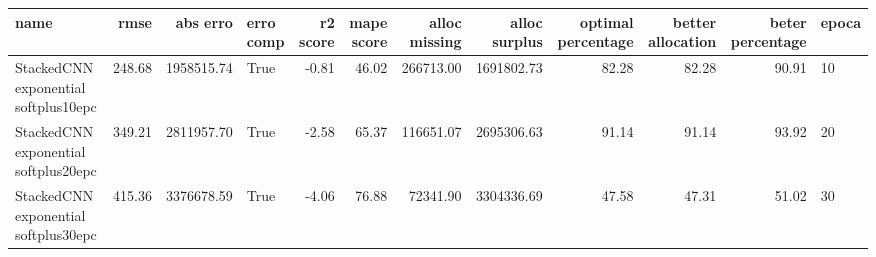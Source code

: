 \begin{tabular}{lrrlrrrrrrrl}
\toprule
name & rmse & abs erro & erro comp & r2 score & mape score & alloc missing & alloc surplus & optimal percentage & better allocation & beter percentage & epoca \\
\midrule
StackedCNN exponential softplus10epc & 248.68 & 1958515.74 & True & -0.81 & 46.02 & 266713.00 & 1691802.73 & 82.28 & 82.28 & 90.91 & 10 \\
StackedCNN exponential softplus20epc & 349.21 & 2811957.70 & True & -2.58 & 65.37 & 116651.07 & 2695306.63 & 91.14 & 91.14 & 93.92 & 20 \\
StackedCNN exponential softplus30epc & 415.36 & 3376678.59 & True & -4.06 & 76.88 & 72341.90 & 3304336.69 & 47.58 & 47.31 & 51.02 & 30 \\
\bottomrule
\end{tabular}
